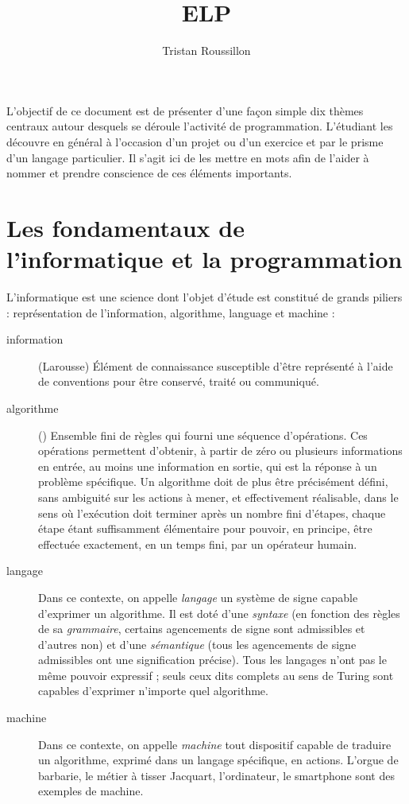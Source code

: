 \documentclass[a4paper,francais]{insalyon}
\title{ELP}
\author{Tristan Roussillon}
\begin{document}
\maketitle

L'objectif de ce document est de présenter d'une façon simple dix thèmes centraux autour desquels se déroule l'activité de programmation. L'étudiant les découvre en général à l'occasion d'un projet ou d'un exercice et par le prisme d'un langage particulier. Il s'agit ici de les mettre en mots afin de l'aider à nommer et prendre conscience de ces éléments importants. 

\section{Les fondamentaux de l'informatique et la programmation}

L'informatique est une science dont l'objet d'étude est constitué de grands piliers : représentation de l'information, algorithme, language et machine \cite{rapportacscience} : 
\begin{description}
\item[information] (Larousse) Élément de connaissance susceptible d'être représenté à l'aide de conventions pour être conservé, traité ou communiqué. 
\item[algorithme] (\cite[p.4]{knuth}) Ensemble fini de règles qui fourni une séquence d'opérations. Ces opérations permettent d'obtenir, à partir de zéro ou plusieurs informations en entrée, au moins une information en sortie, qui est la réponse à un problème spécifique. Un algorithme doit de plus être précisément défini, sans ambiguité sur les actions à mener, et effectivement réalisable, dans le sens où l'exécution doit terminer après un nombre fini d'étapes, chaque étape étant suffisamment élémentaire pour pouvoir, en principe, être effectuée exactement, en un temps fini, par un opérateur humain.
\item[langage] Dans ce contexte, on appelle \emph{langage} un système de signe capable d'exprimer un algorithme. Il est doté d'une \emph{syntaxe} (en fonction des règles de sa \emph{grammaire}, certains agencements de signe sont admissibles et d'autres non) et d'une \emph{sémantique} (tous les agencements de signe admissibles ont une signification précise). Tous les langages n'ont pas le même pouvoir expressif ; seuls ceux dits complets au sens de Turing sont capables d'exprimer n'importe quel algorithme.  
\item[machine] Dans ce contexte, on appelle \emph{machine} tout dispositif capable de traduire un algorithme, exprimé dans un langage spécifique, en actions. L'orgue de barbarie, le métier à tisser Jacquart, l'ordinateur, le smartphone sont des exemples de machine. 
\end{description}
\end{document}
